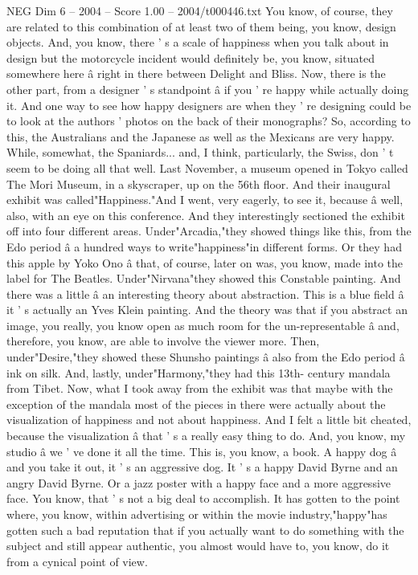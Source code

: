\begin{textsample}{NEG Dim 6 – 2004 – Score 1.00 – 2004/t000446.txt}
You know, of course, they are related to this combination of at least two of them being, you know, design objects.
And, you know, there ' s a scale of happiness when you talk about in design but the motorcycle incident would definitely be, you know, situated somewhere here â right in there between Delight and Bliss.
Now, there is the other part, from a designer ' s standpoint â if you ' re happy while actually doing it.
And one way to see how happy designers are when they ' re designing could be to look at the authors ' photos on the back of their monographs?
So, according to this, the Australians and the Japanese as well as the Mexicans are very happy.
While, somewhat, the Spaniards... and, I think, particularly, the Swiss, don ' t seem to be doing all that well.
Last November, a museum opened in Tokyo called The Mori Museum, in a skyscraper, up on the 56th floor.
And their inaugural exhibit was called"Happiness."And I went, very eagerly, to see it, because â well, also, with an eye on this conference.
And they interestingly sectioned the exhibit off into four different areas.
Under"Arcadia,"they showed things like this, from the Edo period â a hundred ways to write"happiness"in different forms.
Or they had this apple by Yoko Ono â that, of course, later on was, you know, made into the label for The Beatles.
Under"Nirvana"they showed this Constable painting.
And there was a little â an interesting theory about abstraction.
This is a blue field â it ' s actually an Yves Klein painting.
And the theory was that if you abstract an image, you really, you know open as much room for the un-representable â and, therefore, you know, are able to involve the viewer more.
Then, under"Desire,"they showed these Shunsho paintings â also from the Edo period â ink on silk.
And, lastly, under"Harmony,"they had this 13th- century mandala from Tibet.
Now, what I took away from the exhibit was that maybe with the exception of the mandala most of the pieces in there were actually about the visualization of happiness and not about happiness.
And I felt a little bit cheated, because the visualization â that ' s a really easy thing to do.
And, you know, my studio â we ' ve done it all the time.
This is, you know, a book.
A happy dog â and you take it out, it ' s an aggressive dog.
It ' s a happy David Byrne and an angry David Byrne.
Or a jazz poster with a happy face and a more aggressive face.
You know, that ' s not a big deal to accomplish.
It has gotten to the point where, you know, within advertising or within the movie industry,"happy"has gotten such a bad reputation that if you actually want to do something with the subject and still appear authentic, you almost would have to, you know, do it from a cynical point of view.

\end{textsample}
